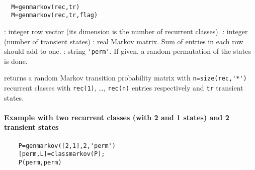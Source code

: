 
\begin{mandesc}
   \\ %
\end{mandesc}
\begin{calling_sequence}
\begin{verbatim}
  M=genmarkov(rec,tr)  
  M=genmarkov(rec,tr,flag)  
\end{verbatim}
\end{calling_sequence}
\begin{parameters}
  \begin{varlist}
    : integer row vector (its dimension is the number of recurrent classes).
    : integer (number of transient states)
    : real Markov matrix. Sum of entries in each row should add to one.
    : string \verb!'perm'!. If given, a random permutation of the states is done.
  \end{varlist}
\end{parameters}
\begin{mandescription}
  returns a random Markov transition probability matrix
  with \verb!n=size(rec,'*')! recurrent classes with \verb!rec(1)!, \ldots, \verb!rec(n)! 
  entries respectively and \verb!tr! transient states.
\end{mandescription}
\begin{examples}
  \paragraph{Example with two recurrent classes (with 2 and 1 states) and 2 transient states}
  \begin{Verbatim}
    P=genmarkov([2,1],2,'perm')
    [perm,L]=classmarkov(P);
    P(perm,perm)
  \end{Verbatim}
\end{examples}
\begin{manseealso}
     
\end{manseealso}

